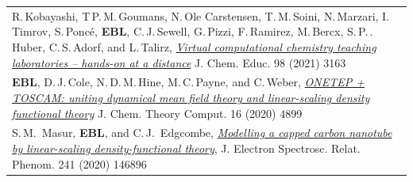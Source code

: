 \documentclass[10pt,a4paper,final]{article}
\begin{document}
\begin{tabularx}{\textwidth}{
   X}
   \footnotesize R.\,Kobayashi, T\,P.\,M.\,Goumans, N.\,Ole Carstensen, T.\,M.\,Soini, N.\,Marzari, I.\,Timrov, S.\,Ponc\'e, \textbf{EBL}, C.\,J.\,Sewell, G.\,Pizzi, F.\,Ramirez, M.\,Bercx, S.\,P.\,. Huber, C.\,S.\,Adorf, and L.\,Talirz, \href{https://doi.org/10.1021/acs.jchemed.1c00655}{\textit{Virtual computational chemistry teaching laboratories – hands-on at a distance}} J. Chem. Educ. 98 (2021) 3163                                                                                                                                                                                                                                                                                                                                                                  \\ %
   \footnotesize \textbf{EBL}, D.\,J.\,Cole, N.\,D.\,M.\,Hine, M.\,C.\,Payne, and C.\,Weber, \href{https://doi.org/10.1021/acs.jctc.0c00162}{\textit{ONETEP + TOSCAM: uniting dynamical mean field theory and linear-scaling density functional theory}} J. Chem. Theory Comput. 16 (2020) 4899                                                                                                                                                                                                                                                                                                                                                                                                                                                                                          \\ %
   \footnotesize S.\,M.\ Masur, \textbf{EBL}, and C.\,J.\ Edgcombe, \href{https://www.sciencedirect.com/science/article/pii/S036820481930221X}{\textit{Modelling a capped carbon nanotube by linear-scaling density-functional theory}}, J. Electron Spectrosc. Relat. Phenom. 241 (2020) 146896                                                                                                                                                                                                                                                                                                                                                                                                                                                                                     \\ %

\end{tabularx}
\end{document}
